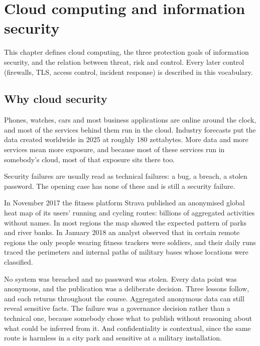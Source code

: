\chapter{Cloud computing and information security}

This chapter defines cloud computing, the three protection goals of
information security, and the relation between threat, risk and control.
Every later control (firewalls, TLS, access control, incident response) is
described in this vocabulary.

\section{Why cloud security}

Phones, watches, cars and most business applications are online around the
clock, and most of the services behind them run in the cloud. Industry
forecasts put the data created worldwide in 2025 at roughly 180 zettabytes.
More data and more services mean more exposure, and because most of these
services run in somebody's cloud, most of that exposure sits there too.

Security failures are usually read as technical failures: a bug, a breach, a
stolen password. The opening case has none of these and is still a security
failure.

\begin{example}\label{ex:strava}
In November 2017 the fitness platform Strava published an anonymised global
heat map of its users' running and cycling routes: billions of aggregated
activities without names. In most regions the map showed the expected pattern
of parks and river banks. In January 2018 an analyst observed that in certain
remote regions the only people wearing fitness trackers were soldiers, and their
daily runs traced the perimeters and internal paths of military bases whose
locations were classified.

No system was breached and no password was stolen. Every data point was
anonymous, and the publication was a deliberate decision. Three lessons follow, and each returns throughout the course. Aggregated
anonymous data can still reveal sensitive facts. The failure was a
governance decision rather than a technical one, because somebody chose what
to publish without reasoning about what could be inferred from it. And
confidentiality is contextual, since the same route is harmless in a city
park and sensitive at a military installation.
\end{example}

